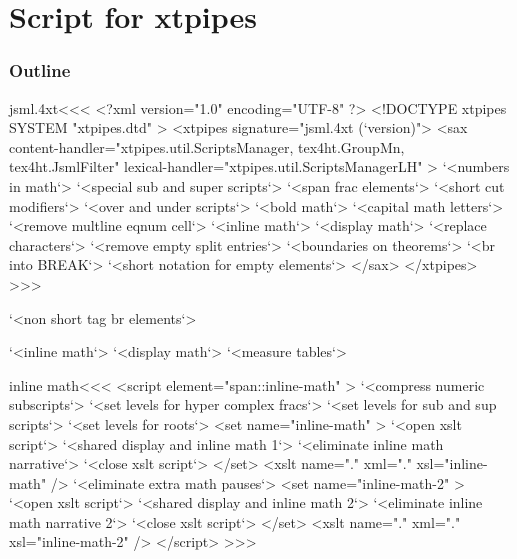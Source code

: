 \documentclass{article}
\begin{document}

\newcount\tmpcnt  \tmpcnt\time  \divide{}
\edef\temp{\the\tmpcnt}
\multiply{} \advance\tmpcnt  \time

\edef\version{\the\year-\ifnum \month<10 0\fi
  \the\month-\ifnum \day<10 0\fi\the\day
   -\ifnum \temp<10 0\fi \temp
   :\ifnum \tmpcnt<10 0\fi\the\tmpcnt}

\def\CopyYear.#1.{%
   \ifnum #1=\year #1\space\space\space\space\space\space
    \else          #1--\the\year\fi
}




\part{Script for xtpipes}


\section{Outline}




\<jsml.4xt\><<<
<?xml version="1.0" encoding="UTF-8" ?>
<!DOCTYPE xtpipes SYSTEM "xtpipes.dtd" >
<xtpipes signature="jsml.4xt (`version)">
   <sax content-handler="xtpipes.util.ScriptsManager, tex4ht.GroupMn, tex4ht.JsmlFilter" 
        lexical-handler="xtpipes.util.ScriptsManagerLH" >
     `<numbers in math`>
     `<special sub and super scripts`> 
     `<span frac elements`>
     `<short cut modifiers`>
     `<over and under scripts`>
     `<bold math`>
     `<capital math letters`>
     `<remove multline eqnum cell`> 
     `<inline math`>
     `<display math`>
     `<replace characters`>
     `<remove empty split entries`>
     `<boundaries on theorems`>
     `<br into BREAK`>
     `<short notation for empty elements`>
   </sax>
</xtpipes>
>>>


     `<non short tag br elements`>     

     `<inline math`>
     `<display math`>
     `<measure tables`>




\<inline math\><<<
<script element="span::inline-math" >
  `<compress numeric subscripts`>
  `<set levels for hyper complex fracs`>
  `<set levels for sub and sup scripts`>
  `<set levels for roots`>
  <set name="inline-math" >
     `<open xslt script`>
     `<shared display and inline math 1`>
     `<eliminate inline math narrative`>
     `<close xslt script`>
  </set>
  <xslt name="." xml="." xsl="inline-math" />
  `<eliminate extra math pauses`>
  <set name="inline-math-2" >
     `<open xslt script`>
     `<shared display and inline math 2`>
     `<eliminate inline math narrative 2`>
     `<close xslt script`>
  </set>
  <xslt name="." xml="." xsl="inline-math-2" />
</script> 
>>>
\end{document}
